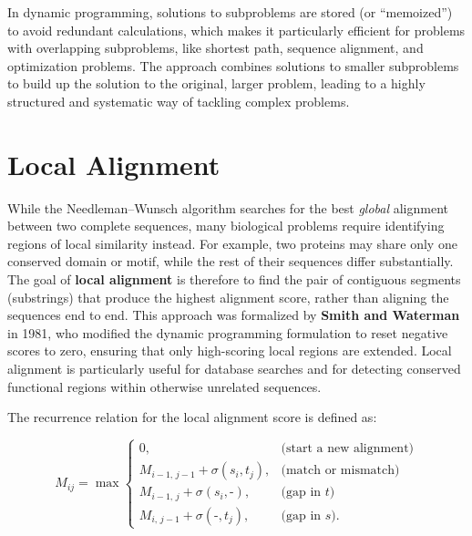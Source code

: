 In dynamic programming, 
solutions to subproblems are stored (or ``memoized'') to avoid redundant calculations, which makes it particularly efficient for problems with overlapping subproblems, like shortest path, sequence alignment, and optimization problems. The approach combines solutions to smaller subproblems to build up the solution to the original, larger problem, leading to a highly structured and systematic way of tackling complex problems.

\section{Local Alignment}

While the Needleman--Wunsch algorithm 
searches for the best \emph{global} alignment between two complete sequences, many biological problems require identifying regions of local similarity instead. For example, two proteins may share only one conserved domain or motif, while the rest of their sequences differ substantially. The goal of \textbf{local alignment} is therefore to find the pair of contiguous segments (substrings) that produce the highest alignment score, rather than aligning the sequences end to end. This approach was formalized by \textbf{Smith and Waterman} in 1981, who modified the dynamic programming formulation to reset negative scores to zero, ensuring that only high-scoring local regions are extended. Local alignment is particularly useful for database searches and for detecting conserved functional regions within otherwise unrelated sequences.

The recurrence relation for the local alignment score is defined as:

\[
M_{ij} = \max
\begin{cases}
0, & \text{(start a new alignment)}\\[6pt]
M_{i-1,\,j-1} + \sigma(s_i, t_j), & \text{(match or mismatch)}\\[6pt]
M_{i-1,\,j} + \sigma(s_i, \texttt{-}), & \text{(gap in $t$)}\\[6pt]
M_{i,\,j-1} + \sigma(\texttt{-}, t_j), & \text{(gap in $s$)}.
\end{cases}
\]

